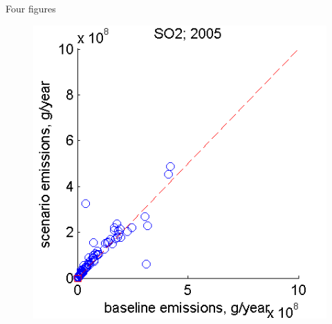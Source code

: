 \documentclass{beamer}	%
\begin{document}
\begin{frame}{Four figures}
\begin{figure}[ht]
\begin{minipage}[t]{0.3\linewidth}
		\includegraphics[width=\textwidth]{images/filename2}
	\end{minipage}\\
	

\end{figure}
\end{frame}
\end{document}
